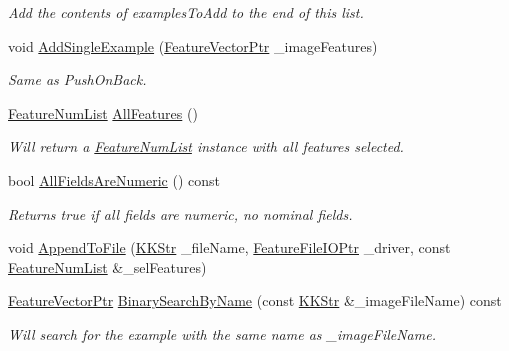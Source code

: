 \begin{DoxyCompactItemize}
\begin{DoxyCompactList}\small\item\em Add the contents of \textquotesingle{}examples\+To\+Add\textquotesingle{} to the end of this list. \end{DoxyCompactList}\item 
void \hyperlink{class_k_k_m_l_l_1_1_feature_vector_list_a4ca2b0e88a70a1cced22de55562c82a6}{Add\+Single\+Example} (\hyperlink{namespace_k_k_m_l_l_a0c5df3d48f45926fbc4fee04f5e3bc04}{Feature\+Vector\+Ptr} \+\_\+image\+Features)
\begin{DoxyCompactList}\small\item\em Same as Push\+On\+Back. \end{DoxyCompactList}\item 
\hyperlink{class_k_k_m_l_l_1_1_feature_num_list}{Feature\+Num\+List} \hyperlink{class_k_k_m_l_l_1_1_feature_vector_list_a3ba96acb7cd625dc94958da2ae750a08}{All\+Features} ()
\begin{DoxyCompactList}\small\item\em Will return a \hyperlink{class_k_k_m_l_l_1_1_feature_num_list}{Feature\+Num\+List} instance with all features selected. \end{DoxyCompactList}\item 
bool \hyperlink{class_k_k_m_l_l_1_1_feature_vector_list_a349dffffbca2b8f86120f1cfe2df5cbf}{All\+Fields\+Are\+Numeric} () const 
\begin{DoxyCompactList}\small\item\em Returns true if all fields are numeric, no nominal fields. \end{DoxyCompactList}\item 
void \hyperlink{class_k_k_m_l_l_1_1_feature_vector_list_aa62e2702ce09f684e432944b3435de34}{Append\+To\+File} (\hyperlink{class_k_k_b_1_1_k_k_str}{K\+K\+Str} \+\_\+file\+Name, \hyperlink{namespace_k_k_m_l_l_aa005d92db87866fad489feb5ff4b2dfa}{Feature\+File\+I\+O\+Ptr} \+\_\+driver, const \hyperlink{class_k_k_m_l_l_1_1_feature_num_list}{Feature\+Num\+List} \&\+\_\+sel\+Features)
\item 
\hyperlink{namespace_k_k_m_l_l_a0c5df3d48f45926fbc4fee04f5e3bc04}{Feature\+Vector\+Ptr} \hyperlink{class_k_k_m_l_l_1_1_feature_vector_list_a33a695d38d4b2ad71048f3c0b75f554a}{Binary\+Search\+By\+Name} (const \hyperlink{class_k_k_b_1_1_k_k_str}{K\+K\+Str} \&\+\_\+image\+File\+Name) const 
\begin{DoxyCompactList}\small\item\em Will search for the example with the same name as \textquotesingle{}\+\_\+image\+File\+Name\textquotesingle{}. \end{DoxyCompactList}\item 

\end{DoxyCompactItemize}
